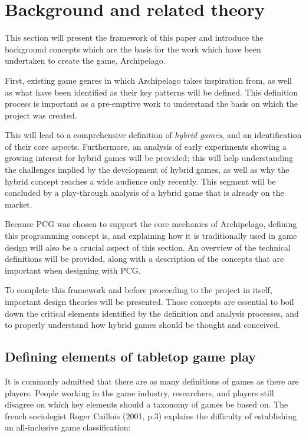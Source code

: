 \chapter{Background and related theory}
This section will present the framework of this paper and introduce the background concepts which are the basis for the work which have been undertaken to create the game, Archipelago. 

First, existing game genres in which Archipelago takes inspiration from, as well as what have been identified as their key patterns will be defined. This definition process is important as a pre-emptive work to understand the basis on which the project was created. 

This will lead to a comprehensive definition of \textit{hybrid games}, and an identification of their core aspects. Furthermore, an analysis of early experiments showing a growing interest for hybrid games will be provided; this will help understanding the challenges implied by the development of hybrid games, as well as why the hybrid concept reaches a wide audience only recently. This segment will be concluded by a play-through analysis of a hybrid game that is already on the market.

Because PCG was chosen to support the core mechanics of Archipelago, defining this programming concept is, and explaining how it is traditionally used in game design will also be a crucial aspect of this section. An overview of the technical definitions will be provided, along with a description of the concepts that are important when designing with PCG. 

To complete this framework and before proceeding to the project in itself, important design theories will be presented. Those concepts are essential to boil down the critical elements identified by the definition and analysis processes, and to properly understand how hybrid games should be thought and conceived.

\section{Defining elements of tabletop game play}
It is commonly admitted that there are as many definitions of games as there are players. People working in the game industry, researchers, and players still disagree on which key elements should a taxonomy of games be based on. The french sociologist Roger Caillois (2001, p.3)\cite{book:mpg} explains the difficulty of establishing an all-inclusive game classification:

